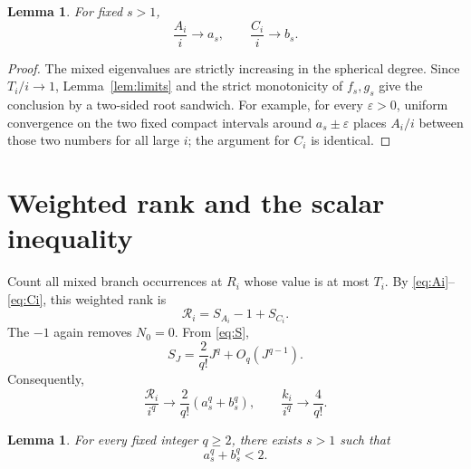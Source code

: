 \documentclass[11pt]{article}
\newtheorem{lemma}[theorem]{Lemma}
\theoremstyle{remark}
\begin{document}
\begin{lemma}\label{lem:cutoffs}
For fixed $s>1$,
\[
 \frac{A_i}{i}\longrightarrow a_s,
 \qquad
 \frac{C_i}{i}\longrightarrow b_s.
\]
\end{lemma}

\begin{proof}
The mixed eigenvalues are strictly increasing in the spherical degree.
Since $T_i/i\to1$, Lemma~\ref{lem:limits} and the strict monotonicity of
$f_s,g_s$ give the conclusion by a two-sided root sandwich.  For example,
for every $\varepsilon>0$, uniform convergence on the two fixed compact
intervals around $a_s\pm\varepsilon$ places $A_i/i$ between those two
numbers for all large $i$; the argument for $C_i$ is identical.
\end{proof}

\section{Weighted rank and the scalar inequality}

Count all mixed branch occurrences at $R_i$ whose value is at most $T_i$.
By \eqref{eq:Ai}--\eqref{eq:Ci}, this weighted rank is
\begin{equation}\label{eq:rank}
 \mathcal R_i=S_{A_i}-1+S_{C_i}.
\end{equation}
The $-1$ again removes $N_0=0$.  From \eqref{eq:S},
\begin{equation}\label{eq:Sasymptotic}
 S_J=\frac{2}{q!}J^q+O_q(J^{q-1}).
\end{equation}
Consequently,
\begin{equation}\label{eq:ranklimits}
 \frac{\mathcal R_i}{i^q}
 \longrightarrow\frac{2}{q!}(a_s^q+b_s^q),
 \qquad
 \frac{k_i}{i^q}\longrightarrow\frac4{q!}.
\end{equation}

\begin{lemma}\label{lem:scalar}
For every fixed integer $q\ge2$, there exists $s>1$ such that
\begin{equation}\label{eq:scalar}
 a_s^q+b_s^q<2.
\end{equation}
\end{lemma}
\end{document}
